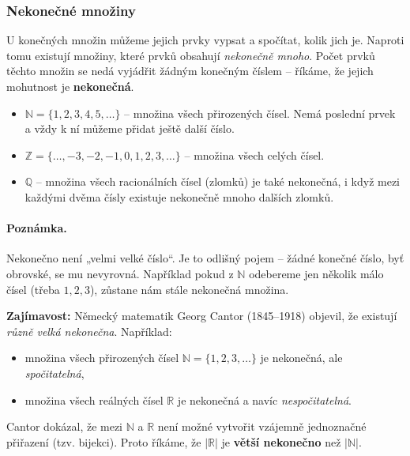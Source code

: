 \documentclass[12pt,a4paper]{article}
\begin{document}
\subsubsection*{Nekonečné množiny}

U konečných množin můžeme jejich prvky vypsat a spočítat, kolik jich je.  
Naproti tomu existují množiny, které prvků obsahují \emph{nekonečně mnoho}.  
Počet prvků těchto množin se nedá vyjádřit žádným konečným číslem – říkáme, že jejich mohutnost je \textbf{nekonečná}.  

\newpage
\begin{examplebox}
\begin{itemize}
    \item $\mathbb{N} = \{1,2,3,4,5,\dots\}$ – množina všech přirozených čísel.  
      Nemá poslední prvek a vždy k ní můžeme přidat ještě další číslo.  
    \item $\mathbb{Z} = \{\dots,-3,-2,-1,0,1,2,3,\dots\}$ – množina všech celých čísel.  
    \item $\mathbb{Q}$ – množina všech racionálních čísel (zlomků) je také nekonečná, i když mezi každými dvěma čísly existuje nekonečně mnoho dalších zlomků.  
\end{itemize}
\end{examplebox}

\paragraph{Poznámka.} Nekonečno není „velmi velké číslo“. Je to odlišný pojem – žádné konečné číslo, byť obrovské, se mu nevyrovná.  
Například pokud z $\mathbb{N}$ odebereme jen několik málo čísel (třeba $1,2,3$), zůstane nám stále nekonečná množina.  

\begin{notebox}
\textbf{Zajímavost:} Německý matematik Georg Cantor (1845–1918) objevil, že existují \emph{různě velká nekonečna}.  
Například:
\begin{itemize}
    \item množina všech přirozených čísel $\mathbb{N} = \{1,2,3,\dots\}$ je nekonečná, ale \emph{spočitatelná},  
    \item množina všech reálných čísel $\mathbb{R}$ je nekonečná a navíc \emph{nespočitatelná}.  
\end{itemize}
Cantor dokázal, že mezi $\mathbb{N}$ a $\mathbb{R}$ není možné vytvořit vzájemně jednoznačné přiřazení (tzv. bijekci).  
Proto říkáme, že $|\mathbb{R}|$ je \textbf{větší nekonečno} než $|\mathbb{N}|$.
\end{notebox}
\end{document}
